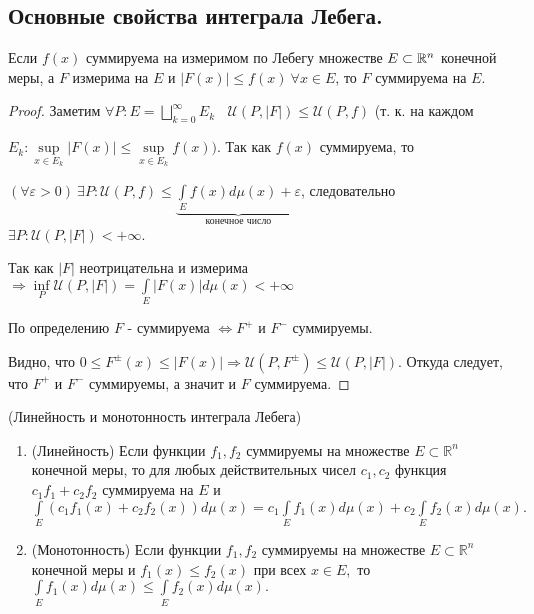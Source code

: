 \setcounter{theorem}{0}
\subsection{Основные свойства интеграла Лебега.}
\begin{lemma}
Если $f(x)$ суммируема на измеримом по Лебегу множестве $E \subset \R^n$ конечной меры, а $F$ измерима на $E$ и $|F(x)| \leqslant f(x)\ \forall x \in E$, то $F$ суммируема на $E$.
\end{lemma}
\begin{proof}
Заметим $\forall P: E = \bigsqcup\limits_{k=0}^{\infty}E_k\ \ \ \ \mathcal{U}(P, |F|) \leqslant \mathcal{U}(P, f)$ \Big(т. к. на каждом 

$E_k: \sup\limits_{x\in E_k} |F(x)| \leqslant \sup\limits_{x\in E_k} f\left(x\right)\Big)$.
Так как $f(x)$ суммируема, то 

$(\forall \varepsilon > 0)\ \exists P: \mathcal{U}(P,f) \leqslant \underbrace{\int\limits_E f(x)d\mu(x)+\varepsilon}_{\text{конечное число}}$, следовательно ${\exists P: \mathcal{U}(P, |F|) < +\infty}$.

Так как $|F|$ неотрицательна и измерима $ \Rightarrow \inf\limits_P \mathcal{U}(P, |F|) = \int\limits_E |F(x)|d\mu(x)<+\infty$

По определению $F$ - суммируема $\Leftrightarrow F^+ \text{ и } F^-$ суммируемы. 

Видно, что $0\leqslant F^\pm(x) \leqslant |F(x)| \Rightarrow \mathcal{U} (P,F^\pm) \leqslant \mathcal{U}(P,|F|)$. Откуда следует, что $F^+$ и $ F^-$ суммируемы, а значит и $F$ суммируема.
\end{proof}


\begin{theorem}(Линейность и монотонность интеграла Лебега)
\begin{enumerate}
\item(Линейность) Если функции $ f_1,f_2 $ суммируемы на множестве $ E\subset\mathbb{R}^n $ конечной меры, то для любых действительных чисел $ c_1,c_2 $ функция $ c_1f_1+c_2f_2 $ суммируема на $ E $ и $ \int\limits_E\left( c_1f_1(x)+c_2f_2(x)\right) d\mu(x)=c_1\int\limits_Ef_1(x)d\mu(x)+c_2\int\limits_Ef_2(x)d\mu(x). $

\item(Монотонность) Если функции $ f_1,f_2 $ суммируемы на множестве $ E\subset\mathbb{R}^n $ конечной меры и $ f_1(x)\leqslant f_2(x) $ при всех $ x\in E, $ то $ \int\limits_Ef_1(x)d\mu(x)\leqslant\int\limits_Ef_2(x)d\mu(x). $
\end{enumerate}
\end{theorem}

